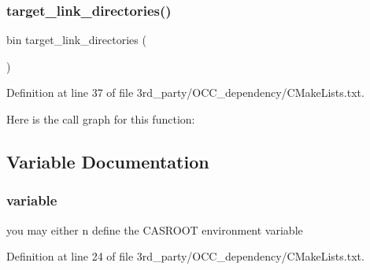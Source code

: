 \subsubsection{\texorpdfstring{target\+\_\+link\+\_\+directories()}{target\_link\_directories()}}
{\footnotesize\ttfamily bin target\+\_\+link\+\_\+directories (\begin{DoxyParamCaption}\item[{O\+CC I\+N\+T\+E\+R\+F\+A\+CE \$\{Open\+C\+A\+S\+C\+A\+D\+E\+\_\+\+L\+I\+B\+R\+A\+R\+Y\+\_\+\+D\+IR\}}]{ }\end{DoxyParamCaption})}



Definition at line 37 of file 3rd\+\_\+party/\+O\+C\+C\+\_\+dependency/\+C\+Make\+Lists.\+txt.


Here is the call graph for this function\+:


\subsection{Variable Documentation}
\mbox{\label{3rd__party_2OCC__dependency_2CMakeLists_8txt_a31b9582447f71bad0d8e48373021512f}} 
\subsubsection{\texorpdfstring{variable}{variable}}
{\footnotesize\ttfamily you may either n define the C\+A\+S\+R\+O\+OT environment variable}



Definition at line 24 of file 3rd\+\_\+party/\+O\+C\+C\+\_\+dependency/\+C\+Make\+Lists.\+txt.

